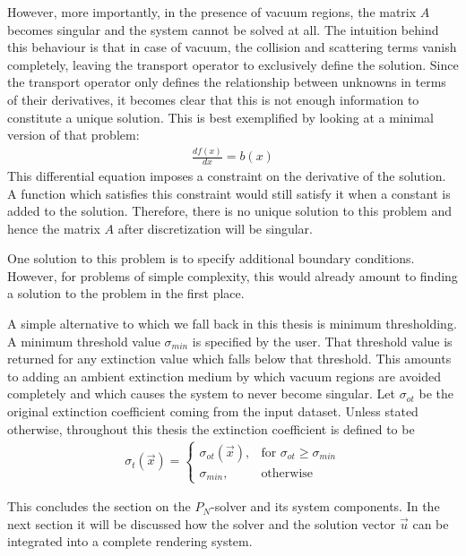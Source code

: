However, more importantly, in the presence of vacuum regions, the matrix $A$ becomes singular and the system cannot be solved at all. The intuition behind this behaviour is that in case of vacuum, the collision and scattering terms vanish completely, leaving the transport operator to exclusively define the solution. Since the transport operator only defines the relationship between unknowns in terms of their derivatives, it becomes clear that this is not enough information to constitute a unique solution. This is best exemplified by looking at a minimal version of that problem:
\begin{align*}
\frac{df\left(x\right)}{dx} = b\left(x\right)
\end{align*}
This differential equation imposes a constraint on the derivative of the solution. A function which satisfies this constraint would still satisfy it when a constant is added to the solution. Therefore, there is no unique solution to this problem and hence the matrix $A$ after discretization will be singular.

One solution to this problem is to specify additional boundary conditions. However, for problems of simple complexity, this would already amount to finding a solution to the problem in the first place.

A simple alternative to which we fall back in this thesis is minimum thresholding. A minimum threshold value $\sigma_{min}$ is specified by the user. That threshold value is returned for any extinction value which falls below that threshold. This amounts to adding an ambient extinction medium by which vacuum regions are avoided completely and which causes the system to never become singular. Let $\sigma_{ot}$ be the original extinction coefficient coming from the input dataset. Unless stated otherwise, throughout this thesis the extinction coefficient is defined to be
\begin{align}
\label{eq:pn_solver_minimum_threshold}
\sigma_t\left(\vec{x}\right) =
\begin{cases}
\sigma_{ot}\left(\vec{x}\right), & \text{for $\sigma_{ot}\ge\sigma_{min}$}
\\
\sigma_{min}, & \text{otherwise}
\end{cases}
\end{align}

This concludes the section on the $P_N$-solver and its system components. In the next section it will be discussed how the solver and the solution vector $\vec{u}$ can be integrated into a complete rendering system.
